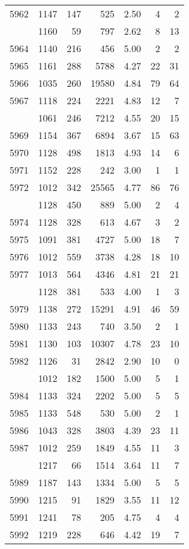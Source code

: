 \documentclass[
]{article}
\begin{document}
\begin{table}
\begin{tabular}[t]{lrrrrrr}
5962 & 1147 & 147 & 525 & 2.50 & 4 & 2\\
\addlinespace
5963 & 1160 & 59 & 797 & 2.62 & 8 & 13\\
5964 & 1140 & 216 & 456 & 5.00 & 2 & 2\\
5965 & 1161 & 288 & 5788 & 4.27 & 22 & 31\\
5966 & 1035 & 260 & 19580 & 4.84 & 79 & 64\\
5967 & 1118 & 224 & 2221 & 4.83 & 12 & 7\\
\addlinespace
5968 & 1061 & 246 & 7212 & 4.55 & 20 & 15\\
5969 & 1154 & 367 & 6894 & 3.67 & 15 & 63\\
5970 & 1128 & 498 & 1813 & 4.93 & 14 & 6\\
5971 & 1152 & 228 & 242 & 3.00 & 1 & 1\\
5972 & 1012 & 342 & 25565 & 4.77 & 86 & 76\\
\addlinespace
5973 & 1128 & 450 & 889 & 5.00 & 2 & 4\\
5974 & 1128 & 328 & 613 & 4.67 & 3 & 2\\
5975 & 1091 & 381 & 4727 & 5.00 & 18 & 7\\
5976 & 1012 & 559 & 3738 & 4.28 & 18 & 10\\
5977 & 1013 & 564 & 4346 & 4.81 & 21 & 21\\
\addlinespace
5978 & 1128 & 381 & 533 & 4.00 & 1 & 3\\
5979 & 1138 & 272 & 15291 & 4.91 & 46 & 59\\
5980 & 1133 & 243 & 740 & 3.50 & 2 & 1\\
5981 & 1130 & 103 & 10307 & 4.78 & 23 & 10\\
5982 & 1126 & 31 & 2842 & 2.90 & 10 & 0\\
\addlinespace
5983 & 1012 & 182 & 1500 & 5.00 & 5 & 1\\
5984 & 1133 & 324 & 2202 & 5.00 & 5 & 5\\
5985 & 1133 & 548 & 530 & 5.00 & 2 & 1\\
5986 & 1043 & 328 & 3803 & 4.39 & 23 & 11\\
5987 & 1012 & 259 & 1849 & 4.55 & 11 & 3\\
\addlinespace
5988 & 1217 & 66 & 1514 & 3.64 & 11 & 7\\
5989 & 1187 & 143 & 1334 & 5.00 & 5 & 5\\
5990 & 1215 & 91 & 1829 & 3.55 & 11 & 12\\
5991 & 1241 & 78 & 205 & 4.75 & 4 & 4\\
5992 & 1219 & 228 & 646 & 4.42 & 19 & 7\\

\end{tabular}
\end{table}
\end{document}
